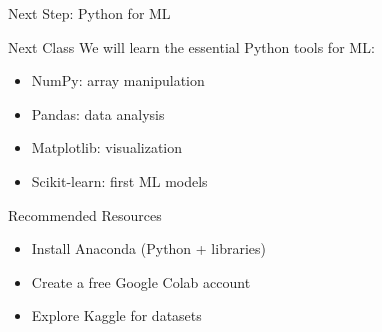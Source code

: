 \documentclass[12pt,aspectratio=169]{beamer}
\begin{document}
\begin{frame}{Next Step: Python for ML}
\begin{block}{Next Class}
We will learn the essential Python tools for ML:
\begin{itemize}
\item NumPy: array manipulation
\item Pandas: data analysis
\item Matplotlib: visualization
\item Scikit-learn: first ML models
\end{itemize}
\end{block}

\vspace{0.5cm}


\begin{block}{Recommended Resources}
\begin{itemize}
\item Install Anaconda (Python + libraries)
\item Create a free Google Colab account
\item Explore Kaggle for datasets
\end{itemize}
\end{block}
\end{frame}
\end{document}
